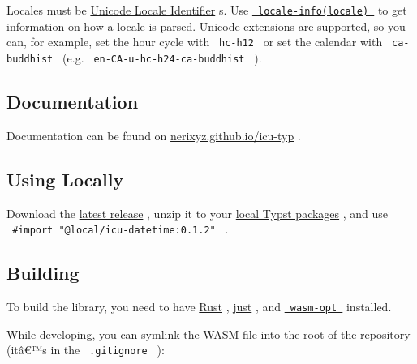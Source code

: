 
Locales must be
\href{https://unicode.org/reports/tr35/tr35.html\#Unicode_locale_identifier}{Unicode
Locale Identifier} s. Use
\href{https://nerixyz.github.io/icu-typ/locale-info/}{\texttt{\ locale-info(locale)\ }}
to get information on how a locale is parsed. Unicode extensions are
supported, so you can, for example, set the hour cycle with
\texttt{\ hc-h12\ } or set the calendar with \texttt{\ ca-buddhist\ }
(e.g. \texttt{\ en-CA-u-hc-h24-ca-buddhist\ } ).

\subsection{Documentation}\label{documentation}

Documentation can be found on
\href{https://nerixyz.github.io/icu-typ}{nerixyz.github.io/icu-typ} .

\subsection{Using Locally}\label{using-locally}

Download the \href{https://github.com/Nerixyz/icu-typ/releases}{latest
release} , unzip it to your
\href{https://github.com/typst/packages\#local-packages}{local Typst
packages} , and use \texttt{\ \#import\ "@local/icu-datetime:0.1.2"\ } .

\subsection{Building}\label{building}

To build the library, you need to have
\href{https://www.rust-lang.org/}{Rust} ,
\href{https://just.systems/}{just} , and
\href{https://github.com/WebAssembly/binaryen}{\texttt{\ wasm-opt\ }}
installed.

\begin{Shaded}
\begin{Highlighting}[]
\end{Highlighting}
\end{Shaded}

While developing, you can symlink the WASM file into the root of the
repository (itâ€™s in the \texttt{\ .gitignore\ } ):

